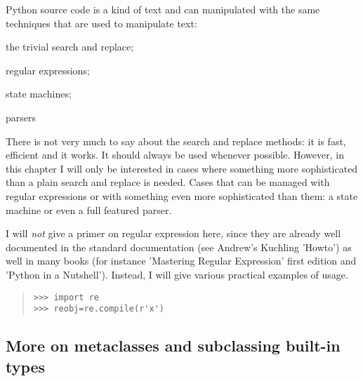 \documentclass[10pt,english]{article}
\begin{document}
Python source code is a kind of text and can manipulated with the same
techniques that are used to manipulate text:
\begin{list}{.}
{
\setlength{\rightmargin}{\leftmargin}
}
\item {} 
the trivial search and replace;

\item {} 
regular expressions;

\item {} 
state machines;

\item {} 
parsers

\end{list}

There is not very much to say about the search and replace methods: it
is fast, efficient and it works. It should always be used whenever
possible. However, in this chapter I will only be interested in cases
where something more sophisticated than a plain search and replace is
needed. Cases that can be managed with regular expressions
or with something even more sophisticated than them: a state machine or
even a full featured parser.

I will \emph{not} give a primer on regular expression here, since they are
already well documented in the standard documentation (see Andrew's
Kuchling 'Howto') as well in many books (for instance 'Mastering Regular
Expression' first edition and 'Python in a Nutshell'). 
Instead, I will give various practical examples of usage.
\begin{quote}
\begin{verbatim}>>> import re
>>> reobj=re.compile(r'x')\end{verbatim}
\end{quote}



\hypertarget{more-on-metaclasses-and-subclassing-built-in-types}{}
\subsection*{More on metaclasses and subclassing built-in types}
\end{document}
